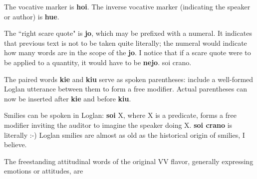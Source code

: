 \documentclass[12pt]{book}
\begin{document}
{The vocative marker is {\bf hoi}.   The inverse vocative marker (indicating the speaker or author) is {\bf hue}.

The ``right scare quote" is {\bf jo}, which may be prefixed with a numeral.   It indicates that previous text is not to be taken quite literally; the numeral would indicate
how many words are in the scope of the {\bf jo}.   I notice that if a scare quote were to be applied to a quantity, it would have to be {\bf nejo}. soi crano.

The paired words {\bf kie} and {\bf kiu} serve as spoken parentheses:  include a well-formed Loglan utterance between them to form a free modifier.   Actual parentheses can now be inserted after {\bf kie}
and before {\bf kiu}.

Smilies can be spoken in Loglan:  {\bf soi} X, where X is a predicate, forms a free modifier inviting the auditor to imagine the speaker doing X.  {\bf soi crano} is literally :-)  Loglan smilies are almost as old as the historical origin of smilies, I believe.

The freestanding attitudinal words of the original VV flavor, generally expressing emotions or attitudes, are  

\begin{description}


\end{description}}
\end{document}
